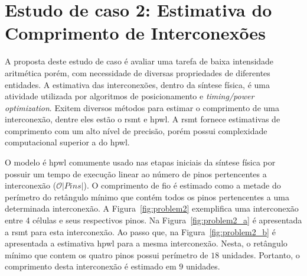 








\section{Estudo de caso 2: Estimativa do Comprimento de Interconexões}
\label{sec:estudo_de_caso_2}

A proposta deste estudo de caso é avaliar uma tarefa de baixa intensidade aritmética porém, com necessidade de diversas propriedades de diferentes entidades.
A estimativa das interconexões, dentro da síntese física, é uma atividade utilizada por algoritmos de posicionamento e \textit{timing/power optimization}.
Exitem diversos métodos para estimar o comprimento de uma interconexão, dentre eles estão o \ac{rsmt} e \ac{hpwl}.
A \ac{rsmt} fornece estimativas de comprimento com um alto nível de precisão, porém possui complexidade computacional superior a do \ac{hpwl}.

O modelo é \ac{hpwl} comumente usado nas etapas iniciais da síntese física por possuir um tempo de execução linear ao número de pinos pertencentes a interconexão ($\mathcal{O}|Pins|$).
O comprimento de fio é estimado como a metade do perímetro do retângulo mínimo que contém todos os pinos pertencentes a uma determinada interconexão.
A Figura~\ref{fig:problem2} exemplifica uma interconexão entre 4 células e seus respectivos pinos.
Na Figura~\ref{fig:problem2_a} é apresentada a \ac{rsmt} para esta interconexão.
Ao passo que, na Figura~\ref{fig:problem2_b} é apresentada a estimativa \ac{hpwl} para a mesma interconexão.
Nesta, o retângulo mínimo que contem os quatro pinos possui perímetro de $18$ unidades. Portanto, o comprimento desta interconexão é estimado em $9$ unidades.

